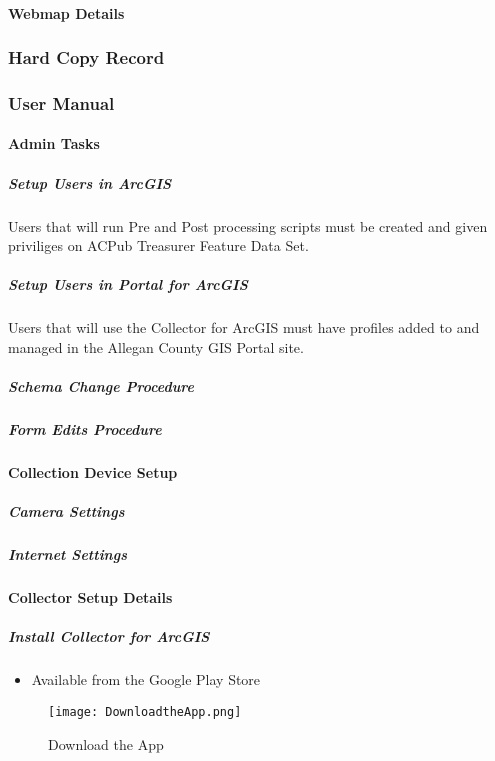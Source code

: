 \documentclass[class=article , crop=false, titlepage, twoside, multi={itemize, figure, verbatim}, float=false]{standalone}
\begin{document}
\clearpage
\paragraph{Webmap Details}

\clearpage
\subsubsection{Hard Copy Record}


\clearpage
\subsubsection{User Manual}

\paragraph{Admin Tasks}

\subparagraph{Setup Users in ArcGIS}Users that will run Pre and Post processing scripts must be created and given priviliges on ACPub Treasurer Feature Data Set.

\subparagraph{Setup Users in Portal for ArcGIS}Users that will use the Collector for ArcGIS must have profiles added to and managed in the Allegan County GIS Portal site.

\subparagraph{Schema Change Procedure}

\subparagraph{Form Edits Procedure}

\paragraph{Collection Device Setup}

\subparagraph{Camera Settings}

\subparagraph{Internet Settings}

\clearpage
\paragraph{Collector Setup Details}

\subparagraph{Install Collector for ArcGIS}
\begin{itemize}
\item Available from the Google Play Store
\end{itemize}
\begin{figure}[h!]
\centering
    \texttt{[image: DownloadtheApp.png]}
\caption{Download the App}
\end{figure}
\end{document}
